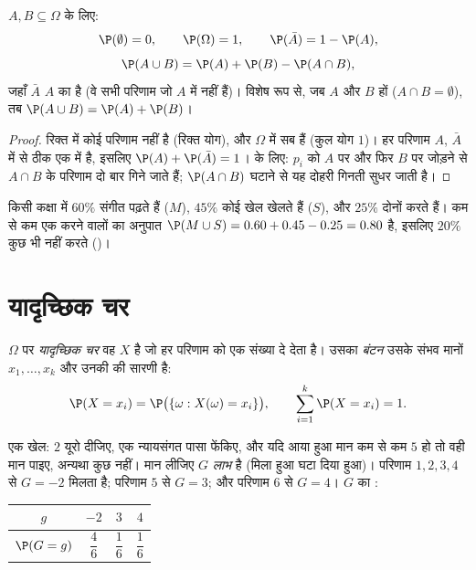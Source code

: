 \begin{proposition}[प्रायिकता के नियम]\label{prop:g11:prob:rules}
 $A, B \subseteq \Omega$ के लिए:
\[
\P(\emptyset) = 0, \qquad \P(\Omega) = 1, \qquad
\P(\bar A) = 1 - \P(A),
\]
\[
\P(A \cup B) = \P(A) + \P(B) - \P(A \cap B),
\]
जहाँ $\bar A$ $A$ का \emph{} है (वे सभी परिणाम जो $A$ में नहीं हैं)।
विशेष रूप से, जब $A$ और $B$ \emph{} हों ($A \cap B = \emptyset$), तब $\P(A \cup B) = \P(A) + \P(B)$।
\end{proposition}

\begin{proof}
रिक्त  में कोई परिणाम नहीं है (रिक्त योग), और $\Omega$ में सब हैं (कुल योग
$1$)। हर परिणाम $A$, $\bar A$ में से ठीक एक में है, इसलिए $\P(A) + \P(\bar A) = 1$।  के
लिए: $p_i$ को $A$ पर और फिर $B$ पर जोड़ने से $A \cap B$ के परिणाम दो बार गिने
जाते हैं; $\P(A \cap B)$ घटाने से यह दोहरी गिनती सुधर जाती है।
\end{proof}

\begin{example}
किसी कक्षा में $60\%$ संगीत पढ़ते हैं ($M$), $45\%$ कोई खेल खेलते हैं ($S$),
और $25\%$ दोनों करते हैं। कम से कम एक करने वालों का अनुपात $\P(M \cup S) = 0.60 + 0.45 - 0.25 = 0.80$ है, इसलिए $20\%$
कुछ भी नहीं करते ()।
\end{example}

\section{यादृच्छिक चर}

\begin{definition}[यादृच्छिक चर, बंटन]\label{def:g11:prob:rv}
$\Omega$ पर \emph{यादृच्छिक चर} वह  $X$ है जो हर परिणाम
को एक संख्या दे देता है। उसका \emph{बंटन} उसके संभव मानों $x_1, \dots, x_k$
और उनकी  की सारणी है:
\[
\P(X = x_i) = \P\bigl(\{\omega : X(\omega) = x_i\}\bigr),
\qquad
\sum_{i=1}^k \P(X = x_i) = 1 .
\]
\end{definition}

\begin{example}\label{ex:g11:prob:game}
एक खेल: $2$ यूरो दीजिए, एक न्यायसंगत पासा फेंकिए, और यदि आया हुआ मान कम से
कम $5$ हो तो वही मान पाइए, अन्यथा कुछ नहीं। मान लीजिए $G$ \emph{लाभ} है
(मिला हुआ घटा दिया हुआ)। परिणाम $1, 2, 3, 4$ से $G = -2$ मिलता है; परिणाम $5$ से $G = 3$;
और परिणाम $6$ से $G = 4$। $G$ का :
\begin{center}
\begin{tabular}{c|ccc}
$g$ & $-2$ & $3$ & $4$\\
\hline\rule{0pt}{11pt}%
$\P(G = g)$ & $\dfrac46$ & $\dfrac16$ & $\dfrac16$
\end{tabular}
\end{center}
\end{example}

